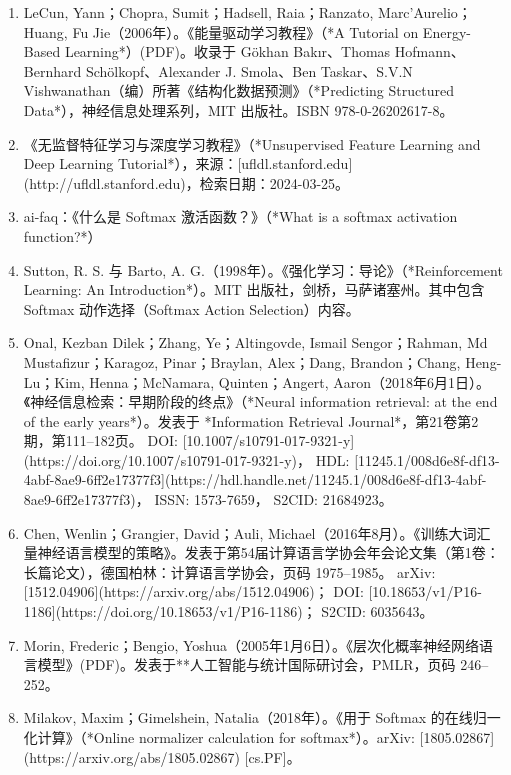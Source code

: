 \begin{enumerate}
\item LeCun, Yann；Chopra, Sumit；Hadsell, Raia；Ranzato, Marc’Aurelio；Huang, Fu Jie（2006年）。《能量驱动学习教程》（*A Tutorial on Energy-Based Learning*）(PDF)。收录于 Gökhan Bakır、Thomas Hofmann、Bernhard Schölkopf、Alexander J. Smola、Ben Taskar、S.V.N Vishwanathan（编）所著《结构化数据预测》（*Predicting Structured Data*），神经信息处理系列，MIT 出版社。ISBN 978-0-26202617-8。
\item 《无监督特征学习与深度学习教程》（*Unsupervised Feature Learning and Deep Learning Tutorial*），来源：[ufldl.stanford.edu](http://ufldl.stanford.edu)，检索日期：2024-03-25。
\item ai-faq：《什么是 Softmax 激活函数？》（*What is a softmax activation function?*）
\item Sutton, R. S. 与 Barto, A. G.（1998年）。《强化学习：导论》（*Reinforcement Learning: An Introduction*）。MIT 出版社，剑桥，马萨诸塞州。其中包含 Softmax 动作选择（Softmax Action Selection）内容。
\item Onal, Kezban Dilek；Zhang, Ye；Altingovde, Ismail Sengor；Rahman, Md Mustafizur；Karagoz, Pinar；Braylan, Alex；Dang, Brandon；Chang, Heng-Lu；Kim, Henna；McNamara, Quinten；Angert, Aaron（2018年6月1日）。《神经信息检索：早期阶段的终点》（*Neural information retrieval: at the end of the early years*）。发表于 *Information Retrieval Journal*，第21卷第2期，第111–182页。
  DOI: [10.1007/s10791-017-9321-y](https://doi.org/10.1007/s10791-017-9321-y)，
  HDL: [11245.1/008d6e8f-df13-4abf-8ae9-6ff2e17377f3](https://hdl.handle.net/11245.1/008d6e8f-df13-4abf-8ae9-6ff2e17377f3)，
  ISSN: 1573-7659，
  S2CID: 21684923。
\item Chen, Wenlin；Grangier, David；Auli, Michael（2016年8月）。《训练大词汇量神经语言模型的策略》。发表于第54届计算语言学协会年会论文集（第1卷：长篇论文），德国柏林：计算语言学协会，页码 1975–1985。
  arXiv: [1512.04906](https://arxiv.org/abs/1512.04906)；
  DOI: [10.18653/v1/P16-1186](https://doi.org/10.18653/v1/P16-1186)；
  S2CID: 6035643。
\item Morin, Frederic；Bengio, Yoshua（2005年1月6日）。《层次化概率神经网络语言模型》(PDF)。发表于**人工智能与统计国际研讨会，PMLR，页码 246–252。
\item Milakov, Maxim；Gimelshein, Natalia（2018年）。《用于 Softmax 的在线归一化计算》（*Online normalizer calculation for softmax*）。arXiv: [1805.02867](https://arxiv.org/abs/1805.02867) [cs.PF]。

\end{enumerate}
